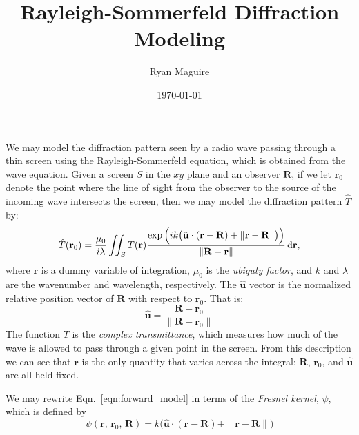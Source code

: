 \documentclass{article}
\title{Rayleigh-Sommerfeld Diffraction Modeling}
\author{Ryan Maguire}
\date{\today}
\begin{document}
    \maketitle
    We may model the diffraction pattern seen by a radio wave passing through a
    thin screen using the Rayleigh-Sommerfeld equation, which is obtained
    from the wave equation. Given a screen $S$ in the $xy$ plane and an observer
    $\mathbf{R}$, if we let $\mathbf{r}_{0}$ denote the point where the line of
    sight from the observer to the source of the incoming wave intersects the screen,
    then we may model the diffraction pattern $\hat{T}$ by:
    \begin{equation}
        \label{eqn:forward_model}
        \hat{T}(\mathbf{r}_{0})
        =
        \frac{\mu_{0}}{i\lambda}
        \iint_{S}
            T(\mathbf{r})
            \frac{%
                \exp\Big(
                    ik\big(
                        \hat{\mathbf{u}}\cdot(\mathbf{r}-\mathbf{R})+\|\mathbf{r}-\mathbf{R}\|
                    \big)
                \Big)
            }{%
                \|\mathbf{R}-\mathbf{r}\|
            }\,\textrm{d}\mathbf{r},
    \end{equation}
    where $\mathbf{r}$ is a dummy variable of integration,
    $\mu_{0}$ is the \textit{ubiquty factor}, and
    $k$ and $\lambda$ are the wavenumber and wavelength, respectively. The $\hat{\mathbf{u}}$
    vector is the normalized relative position vector of $\mathbf{R}$ with respect to
    $\mathbf{r}_{0}$. That is:
    \begin{equation}
        \hat{\mathbf{u}}
        =
        \frac{\mathbf{R}-\mathbf{r}_{0}}{\|\mathbf{R}-\mathbf{r}_{0}\|}
    \end{equation}
    The function $T$ is the \textit{complex transmittance}, which measures how much of
    the wave is allowed to pass through a given point in the screen.
    From this description we can see that $\mathbf{r}$ is the only quantity that varies
    across the integral; $\mathbf{R}$, $\mathbf{r}_{0}$, and $\hat{\mathbf{u}}$ are all held fixed.
    \par\hfill\par
    We may rewrite Eqn.~\ref{eqn:forward_model} in terms of the \textit{Fresnel kernel}, $\psi$,
    which is defined by
    \begin{equation}
        \psi(\mathbf{r},\,\mathbf{r}_{0},\,\mathbf{R})
        =
        k\big(
            \hat{\mathbf{u}}\cdot(\mathbf{r}-\mathbf{R})+\|\mathbf{r}-\mathbf{R}\|
        \big)
    \end{equation}
\end{document}
